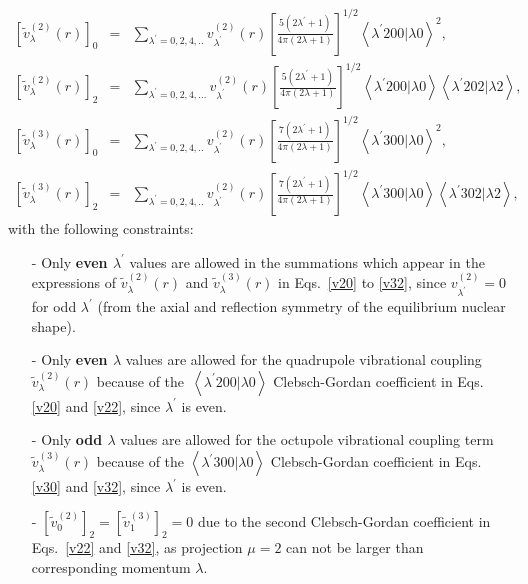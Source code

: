 \begin{eqnarray}
\left[ \tilde{v}_{\lambda }^{(2)}(r)\right] _{0} &=&\sum_{\lambda ^{\prime
}=0,2,4,..}v_{\lambda ^{\prime }}^{(2)}(r)\left[ \frac{5(2\lambda ^{\prime
}+1)}{4\pi (2\lambda +1)}\right] ^{1/2}\left\langle \lambda ^{\prime }200\vert\lambda 0\right\rangle ^{2},
\label{v20} \\
\left[ \tilde{v}_{\lambda }^{(2)}(r)\right] _{2} &=&\sum_{\lambda ^{\prime
}=0,2,4,...}v_{\lambda ^{\prime }}^{(2)}(r)\left[ \frac{5(2\lambda ^{\prime
}+1)}{4\pi (2\lambda +1)}\right] ^{1/2}\left\langle \lambda ^{\prime }200\vert\lambda
0\right\rangle \left\langle \lambda ^{\prime }202\vert\lambda 2\right\rangle ,  \label{v22} \\
\left[ \tilde{v}_{\lambda }^{(3)}(r)\right] _{0} &=&\sum_{\lambda ^{\prime
}=0,2,4,..}v_{\lambda ^{\prime }}^{(2)}(r)\left[ \frac{7(2\lambda ^{\prime
}+1)}{4\pi (2\lambda +1)}\right] ^{1/2}\left\langle \lambda ^{\prime }300\vert\lambda 0\right\rangle ^{2},
\label{v30} \\
\left[ \tilde{v}_{\lambda }^{(3)}(r)\right] _{2} &=&\sum_{\lambda ^{\prime
}=0,2,4,..}v_{\lambda ^{\prime }}^{(2)}(r)\left[ \frac{7(2\lambda ^{\prime
}+1)}{4\pi (2\lambda +1)}\right] ^{1/2}\left\langle \lambda ^{\prime }300\vert\lambda
0\right\rangle \left\langle \lambda ^{\prime }302\vert\lambda 2\right\rangle ,  \label{v32}
\end{eqnarray}%
with the following constraints:

\begin{itemize}
	\item[-] Only {\bfseries even $\lambda ^{\prime }$} values are allowed in
	the summations which appear in the expressions of $\tilde{v}_{\lambda
	}^{(2)}(r)$ and $\tilde{v}_{\lambda }^{(3)}(r)$ in Eqs.~\eqref{v20} to %
	\eqref{v32}, since $v_{\lambda ^{\prime }}^{(2)}=0$ for odd $\lambda
	^{\prime }$ (from the axial and reflection symmetry of the equilibrium
	nuclear shape).
	
	\item[-] Only {\bfseries even $\lambda $} values are allowed for the
	quadrupole vibrational coupling $\tilde{v}_{\lambda }^{(2)}(r)$ because of
	the\ $\left\langle \lambda ^{\prime }200\vert\lambda 0\right\rangle $ Clebsch-Gordan coefficient in Eqs.~%
	\eqref{v20} and \eqref{v22}, since $\lambda ^{\prime }$ is even.
	
	\item[-] Only {\bfseries odd $\lambda $} values are allowed for the octupole
	vibrational coupling term $\tilde{v}_{\lambda }^{(3)}(r)$ because of the $%
	\left\langle \lambda ^{\prime }300\vert\lambda 0\right\rangle $ Clebsch-Gordan coefficient in Eqs.~%
	\eqref{v30} and \eqref{v32}, since $\lambda ^{\prime }$ is even.
	
	\item[-] $[\tilde{v}_{0}^{(2)}]_{2}=[\tilde{v}_{1}^{(3)}]_{2}=0$ due to the
	second Clebsch-Gordan coefficient in Eqs.~\eqref{v22} and \eqref{v32}, as
	projection $\mu =2$ can not be larger than corresponding momentum $\lambda $.
\end{itemize}

